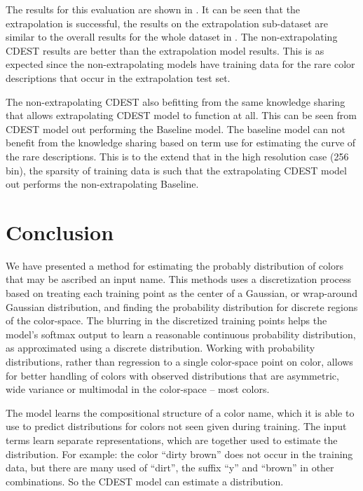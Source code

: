 \documentclass[11pt,letterpaper]{article}
\begin{document}
The results for this evaluation are shown in .
It can be seen that the extrapolation is successful, the results on the extrapolation sub-dataset are similar to the overall results for the whole dataset in .
The non-extrapolating CDEST results are better than the extrapolation model results.
This is as expected since the non-extrapolating models have training data for the rare color descriptions that occur in the extrapolation test set.

The non-extrapolating CDEST also befitting from the same knowledge sharing that allows extrapolating CDEST model to function at all.
This can be seen from CDEST model out performing the Baseline model.
The baseline model can not benefit from the knowledge sharing based on term use for estimating the curve of the rare descriptions.
This is to the extend that in the high resolution case (256 bin),
the sparsity of training data is such that the extrapolating CDEST model out performs the non-extrapolating Baseline.




\section{Conclusion}\label{sec:conclusion}
We have presented a method for estimating the probably distribution of colors that may be ascribed an input name.
This methods uses a discretization process based on treating each training point as the center of a Gaussian, or wrap-around Gaussian distribution, and finding the probability distribution for discrete regions of the color-space.
The blurring in the discretized training points helps the model's softmax output to learn a reasonable continuous probability distribution, as approximated using a discrete distribution.
Working with probability distributions, rather than regression to a single color-space point on color, allows for better handling of colors with observed distributions that are asymmetric, wide variance or multimodal in the color-space -- most colors.

The model learns the compositional structure of a color name, which it is able to use to predict distributions for colors not seen given during training.
The input terms learn separate representations, which are together used to estimate the distribution.
For example: the color ``dirty brown'' does not occur in the training data, but there are many used of ``dirt'', the suffix ``y'' and ``brown'' in other combinations.
So the CDEST model can estimate a distribution.
\end{document}
